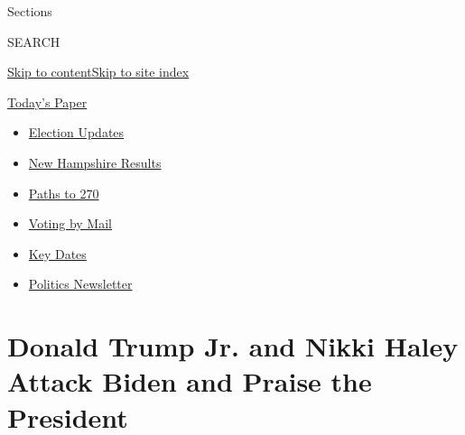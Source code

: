 Sections

SEARCH

\protect\hyperlink{site-content}{Skip to
content}\protect\hyperlink{site-index}{Skip to site index}

\href{https://myaccount.nytimes3xbfgragh.onion/auth/login?response_type=cookie\&client_id=vi}{}

\href{https://www.nytimes3xbfgragh.onion/section/todayspaper}{Today's
Paper}

\begin{itemize}
\item
  \href{https://www.nytimes3xbfgragh.onion/live/2020/09/09/us/trump-vs-biden?action=click\&pgtype=Article\&state=default\&region=TOP_BANNER\&context=storylines_menu}{Election
  Updates}
\item
  \href{https://www.nytimes3xbfgragh.onion/interactive/2020/09/08/us/elections/results-new-hampshire-primary-elections.html?action=click\&pgtype=Article\&state=default\&region=TOP_BANNER\&context=storylines_menu}{New
  Hampshire Results}
\item
  \href{https://www.nytimes3xbfgragh.onion/interactive/2020/us/elections/election-states-biden-trump.html?action=click\&pgtype=Article\&state=default\&region=TOP_BANNER\&context=storylines_menu}{Paths
  to 270}
\item
  \href{https://www.nytimes3xbfgragh.onion/interactive/2020/08/31/us/politics/vote-by-mail-deadlines.html?action=click\&pgtype=Article\&state=default\&region=TOP_BANNER\&context=storylines_menu}{Voting
  by Mail}
\item
  \href{https://www.nytimes3xbfgragh.onion/interactive/2019/us/elections/2020-presidential-election-calendar.html?action=click\&pgtype=Article\&state=default\&region=TOP_BANNER\&context=storylines_menu}{Key
  Dates}
\item
  \href{https://www.nytimes3xbfgragh.onion/newsletters/politics?action=click\&pgtype=Article\&state=default\&region=TOP_BANNER\&context=storylines_menu}{Politics
  Newsletter}
\end{itemize}

\hypertarget{donald-trump-jr-and-nikki-haley-attack-biden-and-praise-the-president}{%
\section{Donald Trump Jr. and Nikki Haley Attack Biden and Praise the
President}\label{donald-trump-jr-and-nikki-haley-attack-biden-and-praise-the-president}}

